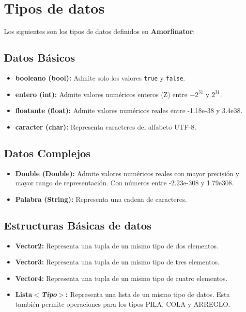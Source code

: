 \section{Tipos de datos}
Los siguientes son los tipos de datos definidos en \textbf{Amorfinator}:

\subsection{Datos Básicos}

\begin{itemize}
 \item {\textbf{booleano (bool):} Admite solo los valores \texttt{true} y \texttt{false}.}
 \item {\textbf{entero (int):} Admite valores numéricos enteros (Z) entre 
  $-2^{31}$ y $2^{31}$.}
 \item {\textbf{floatante (float):} Admite valores numéricos reales entre -1.18e-38  y 3.4e38.}
 \item {\textbf{caracter (char):} Representa caracteres del alfabeto UTF-8.}
\end{itemize}

\subsection{Datos Complejos}

\begin{itemize}
 \item {\textbf{Double (Double):} Admite valores numéricos reales con mayor 
  precisión y mayor rango de representación. Con números entre -2.23e-308 y 1.79e308.}
 \item {\textbf{Palabra (String):} Representa una cadena de caracteres.}
\end{itemize}

\subsection{Estructuras Básicas de datos}

\begin{itemize}
 \item {\textbf{Vector2:} Representa una tupla de un mismo tipo de dos elementos.}
 \item {\textbf{Vector3:} Representa una tupla de un mismo tipo de tres elementos.}
 \item {\textbf{Vector4:} Representa una tupla de un mismo tipo de cuatro elementos.}
 \item {\textbf{Lista$<$\emph{Tipo}$>$:} Representa una lista de un mismo tipo de 
  datos. Esta también permite operaciones para los tipos \gls{PILA}, \gls{COLA}
  y \gls{ARREGLO}.}
\end{itemize}

